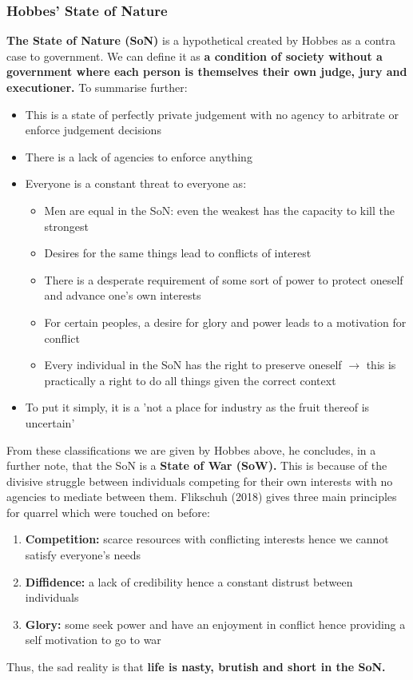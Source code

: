 \documentclass[12pt, letterpaper]{article}
\begin{document}
\subsubsection{Hobbes' State of Nature}
\textbf{The State of Nature (SoN)} is a hypothetical created by Hobbes as a contra case to government. We can define it as \textbf{a condition of society without a government where each person is themselves their own judge, jury and executioner.}
To summarise further:
\begin{itemize}
	\item This is a state of perfectly private judgement with no agency to arbitrate or enforce judgement decisions
	\item There is a lack of agencies to enforce anything
	\item Everyone is a constant threat to everyone as:
		\begin{itemize}
			\item Men are equal in the SoN: even the weakest has the capacity to kill the strongest
			\item Desires for the same things lead to conflicts of interest
			\item There is a desperate requirement of some sort of power to protect oneself and advance one's own interests			
			\item For certain peoples, a desire for glory and power leads to a motivation for conflict
			\item Every individual in the SoN has the right to preserve oneself $\rightarrow$ this is practically a right to do all things given the correct context
		\end{itemize}
	\item To put it simply, it is a 'not a place for industry as the fruit thereof is uncertain'
\end{itemize}
From these classifications we are given by Hobbes above, he concludes, in a further note, that the SoN is a \textbf{State of War (SoW).} This is because of the divisive struggle between individuals competing for their own interests with no agencies to mediate between them. Flikschuh (2018) gives three main principles for quarrel which were touched on before:
\begin{enumerate}
	\item \textbf{Competition:} scarce resources with conflicting interests hence we cannot satisfy everyone's needs
	\item \textbf{Diffidence:} a lack of credibility hence a constant distrust between individuals
	\item \textbf{Glory:} some seek power and have an enjoyment in conflict hence providing a self motivation to go to war
\end{enumerate}
Thus, the sad reality is that \textbf{life is nasty, brutish and short in the SoN.}
\end{document}

